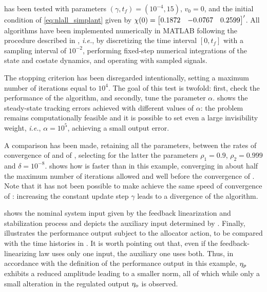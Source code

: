 \begin{example}
   has been tested with parameters $(\gamma,t_f) = (10^{-4}, 15)$, $v_0 = 0$, and the initial condition of \eqref{eq:nlall_simplant} given by $\chi(0)=\begin{bmatrix}0.1872 & -0.0767 & 0.2599\end{bmatrix}'$. All algorithms have been implemented numerically in MATLAB following the procedure described in , \emph{i.e.}, by discretizing the time interval $[0,t_f]$ with a sampling interval of $10^{-2}$, performing fixed-step numerical integrations of the state and costate dynamics, and operating with sampled signals.

  The stopping criterion has been disregarded intentionally, setting a maximum number of iterations equal to $10^4$. The goal of this test is twofold: first, check the performance of the algorithm, and secondly, tune the parameter $\alpha$.  shows the steady-state tracking errors achieved with different values of $\alpha$: the problem remains computationally feasible and it is possible to set even a large invisibility weight, \emph{i.e.}, $\alpha=10^5$, achieving a small output error.

  A comparison has been made, retaining all the parameters, between the rates of convergence of  and of , selecting for the latter the parameters $\rho_1 = 0.9$, $\rho_2 = 0.999$ and $\delta = 10^{-8}$.  shows how  is faster than  in this example, converging in about half the maximum number of iterations allowed and well before the convergence of . Note that it has not been possible to make  achieve the same speed of convergence of : increasing the constant update step $\gamma$ leads to a divergence of the algorithm.

   shows the nominal system input given by the feedback linearization and stabilization process and  depicts the auxiliary input determined by . Finally,  illustrates the performance output subject to the allocator action, to be compared with the time histories in . It is worth pointing out that, even if the feedback-linearizing law uses only one input, the auxiliary one uses both. Thus, in accordance with the definition of the performance output in this example, $\eta_p$ exhibits a reduced amplitude leading to a smaller norm, all of which while only a small alteration in the regulated output $\eta_o$ is observed.\closeexample
\end{example}
